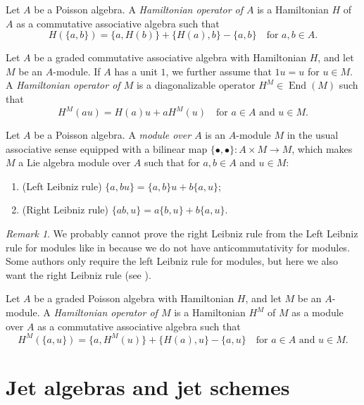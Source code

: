\documentclass[a4paper, 12pt, reqno]{amsart}
\theoremstyle{remark}
\newtheorem{remark}[theorem]{Remark}
\DeclareMathOperator{\End}{End}
\begin{document}
Let $A$ be a Poisson algebra.
A \emph{Hamiltonian operator of $A$} is a Hamiltonian $H$ of $A$ as a commutative associative algebra such that
\begin{equation*}
  H(\{a, b\}) = \{a, H(b)\} + \{H(a), b\} - \{a, b\} \quad \text{for $a, b \in A$}.
\end{equation*}

Let $A$ be a graded commutative associative algebra with Hamiltonian $H$, and let $M$ be an $A$-module.
If $A$ has a unit $1$, we further assume that $1u = u$ for $u \in M$.
A \emph{Hamiltonian operator of $M$} is a diagonalizable operator $H^M \in \End(M)$ such that
\begin{equation*}
  H^M(au) = H(a)u + aH^M(u) \quad \text{for $a \in A$ and $u \in M$}.
\end{equation*}

Let $A$ be a Poisson algebra.
A \emph{module over $A$} is an $A$-module $M$ in the usual associative sense equipped with a bilinear map $\{\bullet, \bullet\}: A \times M \to M$, which makes $M$ a Lie algebra module over $A$ such that for $a, b \in A$ and $u \in M$:
\begin{enumerate}
\item (Left Leibniz rule) $\{a, bu\} = \{a, b\}u + b\{a, u\}$;
\item (Right Leibniz rule) $\{ab, u\} = a\{b, u\} + b\{a, u\}$.
\end{enumerate}

\begin{remark}
  \label{rmk:53}
  We probably cannot prove the right Leibniz rule from the Left Leibniz rule for modules like in  because we do not have anticommutativity for modules.
  Some authors only require the left Leibniz rule for modules, but here we also want the right Leibniz rule (see \cite{caressa_examples_2003}).
\end{remark}

Let $A$ be a graded Poisson algebra with Hamiltonian $H$, and let $M$ be an $A$-module.
A \emph{Hamiltonian operator of $M$} is a Hamiltonian $H^M$ of $M$ as a module over $A$ as a commutative associative algebra such that
\begin{equation*}
  H^M(\{a, u\}) = \{a, H^M(u)\} + \{H(a), u\} - \{a, u\} \quad \text{for $a \in A$ and $u \in M$}.
\end{equation*}

\section{Jet algebras and jet schemes}
\label{sec:jet-algebras-jet}
\end{document}
